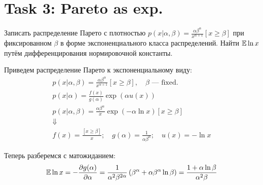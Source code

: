 
\section{Task 3: Pareto as exp.}

\begin{task}
    Записать распределение Парето с плотностью $p(x|\alpha, \beta) = \frac{\alpha \beta^{\alpha}}{x^{\alpha + 1}}[x \ge \beta]$ при фиксированном $\beta$ в форме экспоненциального класса распределений. Найти $\mathbb{E} \ln x$ путём дифференцирования нормировочной константы.
\end{task}

\begin{solution}

    Приведем распределение Парето к экспоненциальному виду:
    \begin{gather}
        p(x|\alpha, \beta) = \frac{\alpha \beta^{\alpha}}{x^{\alpha + 1}}[x \ge \beta], \quad \beta \text{ --- fixed.} \\
        p(x | \alpha) = \frac{f(x)}{g(\alpha)}\exp(\alpha u(x)) \\
        p(x | \alpha, \beta) = \frac{\alpha \beta^{\alpha}}{x} \exp(-\alpha \ln x)[x \ge \beta] \\
        \Downarrow \\
        f(x) = \frac{[x \ge \beta]}{x}; \quad g(\alpha) = \frac{1}{\alpha \beta^{\alpha}}; \quad u(x) = -\ln x
    \end{gather}

    Теперь разберемся с матожиданием:
    \begin{gather}
        \mathbb{E} \ln x = -\frac{\partial g(\alpha)}{\partial \alpha} = \frac{1}{\alpha^2 \beta^{2 \alpha}}\left( \beta^{\alpha} + \alpha \beta^{\alpha} \ln \beta \right) = \frac{1 + \alpha \ln \beta}{\alpha^2 \beta}
    \end{gather}
\end{solution}